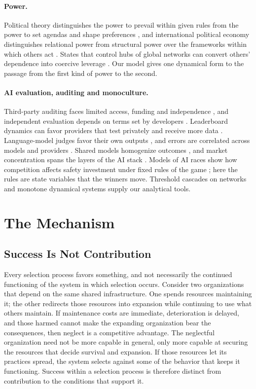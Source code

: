 \documentclass[letterpaper]{article} %
\theoremstyle{definition}
\begin{document}
\paragraph{Power.} Political theory distinguishes the power to prevail within given rules from the power to set agendas and shape preferences \citep{bachrach1962,lukes2005}, and international political economy distinguishes relational power from structural power over the frameworks within which others act \citep{strange1988}. States that control hubs of global networks can convert others' dependence into coercive leverage \citep{farrell2019}. Our model gives one dynamical form to the passage from the first kind of power to the second.

\paragraph{AI evaluation, auditing and monoculture.} Third-party auditing faces limited access, funding and independence \citep{raji2022,costanzachock2022,birhane2024}, and independent evaluation depends on terms set by developers \citep{longpre2024}. Leaderboard dynamics can favor providers that test privately and receive more data \citep{singh2025}. Language-model judges favor their own outputs \citep{zheng2023,panickssery2024}, and errors are correlated across models and providers \citep{kim2025}. Shared models homogenize outcomes \citep{bommasani2021,kleinberg2021,bommasani2022}, and market concentration spans the layers of the AI stack \citep{narechania2024}. Models of AI races show how competition affects safety investment under fixed rules of the game \citep{armstrong2016,han2021}; here the rules are state variables that the winners move. Threshold cascades on networks \citep{granovetter1978,watts2002} and monotone dynamical systems \citep{hirsch1985,smith1995} supply our analytical tools.

\section{The Mechanism}\label{sec:mechanism}

\subsection{Success Is Not Contribution}

Every selection process favors something, and not necessarily the continued functioning of the system in which selection occurs. Consider two organizations that depend on the same shared infrastructure. One spends resources maintaining it; the other redirects those resources into expansion while continuing to use what others maintain. If maintenance costs are immediate, deterioration is delayed, and those harmed cannot make the expanding organization bear the consequences, then neglect is a competitive advantage. The neglectful organization need not be more capable in general, only more capable at securing the resources that decide survival and expansion. If those resources let its practices spread, the system selects against some of the behavior that keeps it functioning. Success within a selection process is therefore distinct from contribution to the conditions that support it.
\end{document}
